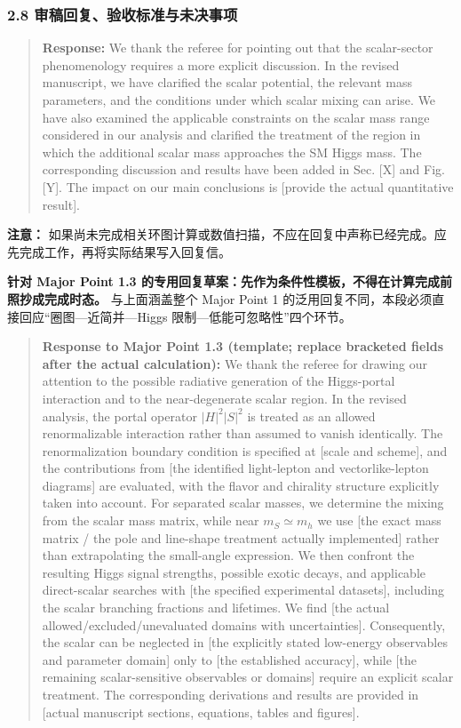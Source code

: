 \documentclass[
]{article}
\begin{document}
\subsubsection{2.8
审稿回复、验收标准与未决事项}\label{ux5ba1ux7a3fux56deux590dux9a8cux6536ux6807ux51c6ux4e0eux672aux51b3ux4e8bux9879}

\begin{quote}
\textbf{Response:} We thank the referee for pointing out that the
scalar-sector phenomenology requires a more explicit discussion. In the
revised manuscript, we have clarified the scalar potential, the relevant
mass parameters, and the conditions under which scalar mixing can arise.
We have also examined the applicable constraints on the scalar mass
range considered in our analysis and clarified the treatment of the
region in which the additional scalar mass approaches the SM Higgs mass.
The corresponding discussion and results have been added in Sec. {[}X{]}
and Fig. {[}Y{]}. The impact on our main conclusions is {[}provide the
actual quantitative result{]}.
\end{quote}

\textbf{注意：}
如果尚未完成相关环图计算或数值扫描，不应在回复中声称已经完成。应先完成工作，再将实际结果写入回复信。

\textbf{针对 Major Point 1.3
的专用回复草案：先作为条件性模板，不得在计算完成前照抄成完成时态。}
与上面涵盖整个 Major Point 1
的泛用回复不同，本段必须直接回应``圈图---近简并---Higgs
限制---低能可忽略性''四个环节。

\begin{quote}
\textbf{Response to Major Point 1.3 (template; replace bracketed fields
after the actual calculation):} We thank the referee for drawing our
attention to the possible radiative generation of the Higgs-portal
interaction and to the near-degenerate scalar region. In the revised
analysis, the portal operator \(|H|^2|S|^2\) is treated as an allowed
renormalizable interaction rather than assumed to vanish identically.
The renormalization boundary condition is specified at {[}scale and
scheme{]}, and the contributions from {[}the identified light-lepton and
vectorlike-lepton diagrams{]} are evaluated, with the flavor and
chirality structure explicitly taken into account. For separated scalar
masses, we determine the mixing from the scalar mass matrix, while near
\(m_S\simeq m_h\) we use {[}the exact mass matrix / the pole and
line-shape treatment actually implemented{]} rather than extrapolating
the small-angle expression. We then confront the resulting Higgs signal
strengths, possible exotic decays, and applicable direct-scalar searches
with {[}the specified experimental datasets{]}, including the scalar
branching fractions and lifetimes. We find {[}the actual
allowed/excluded/unevaluated domains with uncertainties{]}.
Consequently, the scalar can be neglected in {[}the explicitly stated
low-energy observables and parameter domain{]} only to {[}the
established accuracy{]}, while {[}the remaining scalar-sensitive
observables or domains{]} require an explicit scalar treatment. The
corresponding derivations and results are provided in {[}actual
manuscript sections, equations, tables and figures{]}.
\end{quote}
\end{document}
